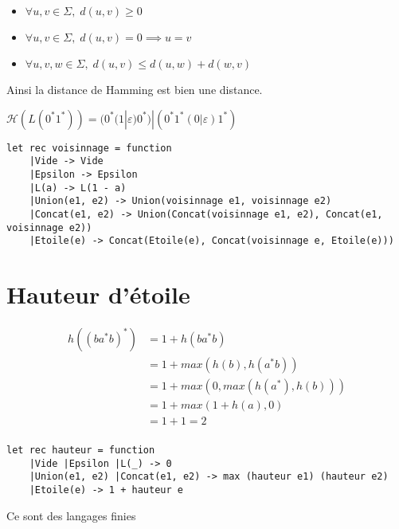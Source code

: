 \documentclass{article}
\begin{document}
\begin{question}

    \item \begin{itemize}
        \item $\forall u, v \in \Sigma,\; d(u, v) \geqslant 0$
        \item $\forall u, v \in \Sigma,\; d(u, v) = 0 \implies u = v$
        \item $\forall u, v, w \in \Sigma,\; d(u, v) \leqslant d(u, w) + d(w, v)$
    \end{itemize}
Ainsi la distance de Hamming est bien une distance.

    \item
    $\mathcal{H}(L(0^*1^*)) = (0^*(1 | \varepsilon)0^*) | (0^*1^*(0 | \varepsilon)1^*)$

    \item 

    \item \begin{verbatim}
let rec voisinnage = function 
    |Vide -> Vide
    |Epsilon -> Epsilon
    |L(a) -> L(1 - a)
    |Union(e1, e2) -> Union(voisinnage e1, voisinnage e2)
    |Concat(e1, e2) -> Union(Concat(voisinnage e1, e2), Concat(e1, voisinnage e2))
    |Etoile(e) -> Concat(Etoile(e), Concat(voisinnage e, Etoile(e)))
    \end{verbatim}

\end{question}

\section{Hauteur d'étoile}

\begin{question}

    \item \begin{align*}
        h((ba^*b)^*) &= 1 + h(ba^*b) \\
                     &= 1 + max(h(b), h(a^*b)) \\
                     &= 1 + max(0, max(h(a^*), h(b))) \\
                     &= 1 + max(1 + h(a), 0) \\
                     &= 1 + 1 = 2 \\
    \end{align*}

    \item \begin{verbatim}
let rec hauteur = function
    |Vide |Epsilon |L(_) -> 0
    |Union(e1, e2) |Concat(e1, e2) -> max (hauteur e1) (hauteur e2)
    |Etoile(e) -> 1 + hauteur e
    \end{verbatim}

    \item Ce sont des langages finies
\end{question}
\end{document}
